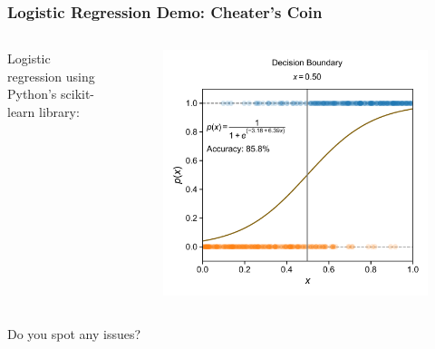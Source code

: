 \documentclass[10pt,aspectratio=169]{beamer}
\begin{document}
      \begin{frame}
        \frametitle{Logistic Regression Demo: Cheater’s Coin}
        \begin{columns}[T]
          \begin{column}{0.45\textwidth}
            Logistic regression using Python's scikit-learn library:
            
            \inputminted[fontsize=\scriptsize]{python}{sample_lr_coin.py}
          \end{column}

          \begin{column}{0.55\textwidth}
            \begin{figure}[t]%
              \hspace*{-0.1\textwidth}%
              \includegraphics[width=1.20\textwidth]{scripts/coin_fit_lr.pdf}
            \end{figure}
          \end{column}
        \end{columns}

        Do you spot any issues?
      \end{frame}

     
\end{document}
